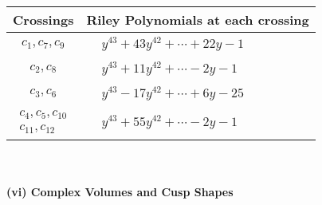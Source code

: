 \documentclass[1p]{elsarticle_modified}
\theoremstyle{definition}
\begin{document}
\begin{tabular}{m{50pt}|m{274pt}}
Crossings & \hspace{64pt}Riley Polynomials at each crossing \\
\hline $$\begin{aligned}c_{1},c_{7},c_{9}\end{aligned}$$&$\begin{aligned}
&y^{43}+43 y^{42}+\cdots+22 y-1
\end{aligned}$\\
\hline $$\begin{aligned}c_{2},c_{8}\end{aligned}$$&$\begin{aligned}
&y^{43}+11 y^{42}+\cdots-2 y-1
\end{aligned}$\\
\hline $$\begin{aligned}c_{3},c_{6}\end{aligned}$$&$\begin{aligned}
&y^{43}-17 y^{42}+\cdots+6 y-25
\end{aligned}$\\
\hline $$\begin{aligned}c_{4},c_{5},c_{10}\\c_{11},c_{12}\end{aligned}$$&$\begin{aligned}
&y^{43}+55 y^{42}+\cdots-2 y-1
\end{aligned}$\\
\hline
\end{tabular}\\~\\
\newpage\flushleft \textbf{(vi) Complex Volumes and Cusp Shapes}
\end{document}
